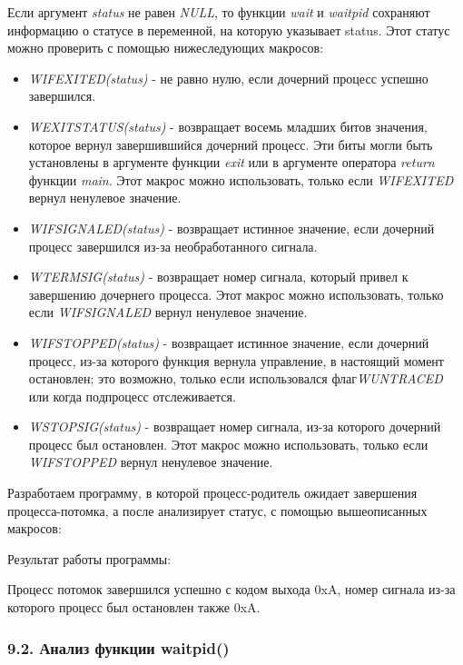 \documentclass[14pt,a4paper,report]{report}
\begin{document}
Если аргумент \emph{status} не равен \emph{NULL}, то функции \emph{wait} и \emph{waitpid} сохраняют информацию о статусе в переменной, на которую указывает status. Этот статус можно проверить с помощью нижеследующих макросов:

\begin{itemize}
	\item \emph{WIFEXITED(status)} - не равно нулю, если дочерний процесс успешно завершился.
	\item \emph{WEXITSTATUS(status)} - возвращает восемь младших битов значения, которое вернул завершившийся дочерний процесс. Эти биты могли быть установлены в аргументе функции \emph{exit} или в аргументе оператора \emph{return} функции \emph{main}. Этот макрос можно использовать, только если \emph{WIFEXITED} вернул ненулевое значение.
	\item \emph{WIFSIGNALED(status)} - возвращает истинное значение, если дочерний процесс завершился из-за необработанного сигнала.
	\item \emph{WTERMSIG(status)} - возвращает номер сигнала, который привел к завершению дочернего процесса. Этот макрос можно использовать, только если \emph{WIFSIGNALED} вернул ненулевое значение.
	\item \emph{WIFSTOPPED(status)} - возвращает истинное значение, если дочерний процесс, из-за которого функция вернула управление, в настоящий момент остановлен; это возможно, только если использовался флаг\emph{WUNTRACED} или когда подпроцесс отслеживается.
	\item \emph{WSTOPSIG(status)} - возвращает номер сигнала, из-за которого дочерний процесс был остановлен. Этот макрос можно использовать, только если \emph{WIFSTOPPED} вернул ненулевое значение.
\end{itemize}

Разработаем программу, в которой процесс-родитель ожидает завершения процесса-потомка, а после анализирует статус, с помощью вышеописанных макросов:



Результат работы программы: 



Процесс потомок завершился успешно с кодом выхода 0xA, номер сигнала из-за которого процесс был остановлен также 0xA.

\subsubsection{9.2. Анализ функции waitpid()}
\end{document}
